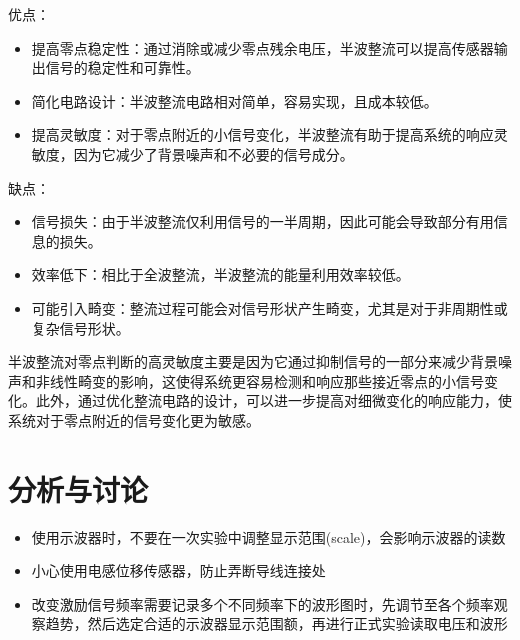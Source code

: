 \documentclass{article}
\begin{document}
优点：
\begin{itemize}
   \item 提高零点稳定性：通过消除或减少零点残余电压，半波整流可以提高传感器输出信号的稳定性和可靠性。
   \item 简化电路设计：半波整流电路相对简单，容易实现，且成本较低。
   \item 提高灵敏度：对于零点附近的小信号变化，半波整流有助于提高系统的响应灵敏度，因为它减少了背景噪声和不必要的信号成分。
\end{itemize}

缺点：
\begin{itemize}
   \item 信号损失：由于半波整流仅利用信号的一半周期，因此可能会导致部分有用信息的损失。
   \item 效率低下：相比于全波整流，半波整流的能量利用效率较低。
   \item 可能引入畸变：整流过程可能会对信号形状产生畸变，尤其是对于非周期性或复杂信号形状。
\end{itemize}

半波整流对零点判断的高灵敏度主要是因为它通过抑制信号的一部分来减少背景噪声和非线性畸变的影响，这使得系统更容易检测和响应那些接近零点的小信号变化。此外，通过优化整流电路的设计，可以进一步提高对细微变化的响应能力，使系统对于零点附近的信号变化更为敏感。

\section{分析与讨论}
\begin{itemize}
    \item 使用示波器时，不要在一次实验中调整显示范围(scale)，会影响示波器的读数
    \item 小心使用电感位移传感器，防止弄断导线连接处
    \item 改变激励信号频率需要记录多个不同频率下的波形图时，先调节至各个频率观察趋势，然后选定合适的示波器显示范围额，再进行正式实验读取电压和波形
\end{itemize}
\end{document}
